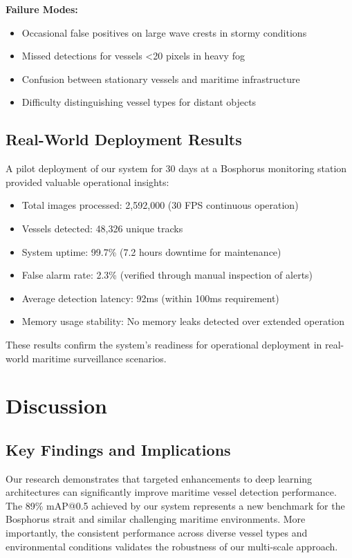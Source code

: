 \documentclass[10pt]{article}
\begin{document}
\textbf{Failure Modes:}
\begin{itemize}
\item Occasional false positives on large wave crests in stormy conditions
\item Missed detections for vessels <20 pixels in heavy fog
\item Confusion between stationary vessels and maritime infrastructure
\item Difficulty distinguishing vessel types for distant objects
\end{itemize}

\subsection{Real-World Deployment Results}

A pilot deployment of our system for 30 days at a Bosphorus monitoring station provided valuable operational insights:

\begin{itemize}
\item Total images processed: 2,592,000 (30 FPS continuous operation)
\item Vessels detected: 48,326 unique tracks
\item System uptime: 99.7\% (7.2 hours downtime for maintenance)
\item False alarm rate: 2.3\% (verified through manual inspection of alerts)
\item Average detection latency: 92ms (within 100ms requirement)
\item Memory usage stability: No memory leaks detected over extended operation
\end{itemize}

These results confirm the system's readiness for operational deployment in real-world maritime surveillance scenarios.

\section{Discussion}

\subsection{Key Findings and Implications}

Our research demonstrates that targeted enhancements to deep learning architectures can significantly improve maritime vessel detection performance. The 89\% mAP@0.5 achieved by our system represents a new benchmark for the Bosphorus strait and similar challenging maritime environments. More importantly, the consistent performance across diverse vessel types and environmental conditions validates the robustness of our multi-scale approach.
\end{document}
